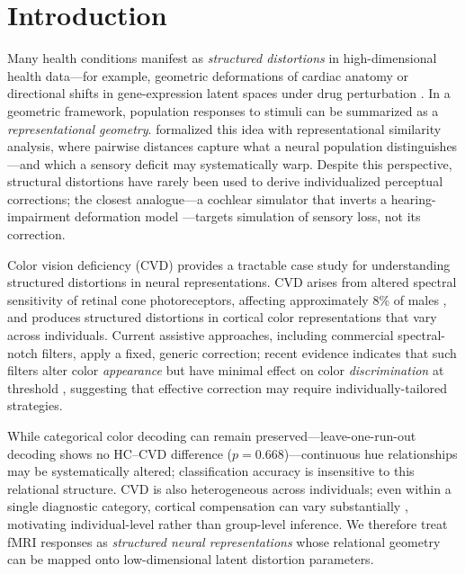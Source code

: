 \documentclass{article}
\begin{document}
\section{Introduction}
\label{sec:intro}

Many health conditions manifest as \emph{structured distortions} in high-dimensional health data---for example, geometric deformations of cardiac anatomy \citep{biffi2020} or directional shifts in gene-expression latent spaces under drug perturbation \citep{lotfollahi2019}.
In a geometric framework, population responses to stimuli can be summarized as a \emph{representational geometry}.
\citet{kriegeskorte2008} formalized this idea with representational similarity analysis, where pairwise distances capture what a neural population distinguishes---and which a sensory deficit may systematically warp.
Despite this perspective, structural distortions have rarely been used to derive individualized perceptual corrections; the closest analogue---a cochlear simulator that inverts a hearing-impairment deformation model \citep{irino2023}---targets simulation of sensory loss, not its correction.

Color vision deficiency (CVD) provides a tractable case study for understanding structured distortions in neural representations.
CVD arises from altered spectral sensitivity of retinal cone photoreceptors, affecting approximately 8\% of males \citep{machado2009}, and produces structured distortions in cortical color representations that vary across individuals.
Current assistive approaches, including commercial spectral-notch filters, apply a fixed, generic correction; recent evidence indicates that such filters alter color \emph{appearance} but have minimal effect on color \emph{discrimination} at threshold \citep{somers2024}, suggesting that effective correction may require individually-tailored strategies.

While categorical color decoding can remain preserved---leave-one-run-out decoding shows no HC--CVD difference ($p = 0.668$)---continuous hue relationships may be systematically altered; classification accuracy is insensitive to this relational structure.
CVD is also heterogeneous across individuals; even within a single diagnostic category, cortical compensation can vary substantially \citep{tregillus2021}, motivating individual-level rather than group-level inference.
We therefore treat fMRI responses as \emph{structured neural representations} whose relational geometry can be mapped onto low-dimensional latent distortion parameters.
\end{document}
